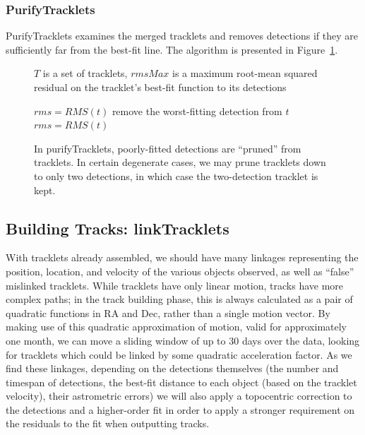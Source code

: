 \subsubsection{PurifyTracklets}
PurifyTracklets examines the merged tracklets and removes detections
if they are sufficiently far from the best-fit line. The algorithm is
presented in Figure~\ref{purifyTrackletsAlgorithm}. 

\begin{figure}[ht]
\hrulefill
\begin{algorithmic}[5]
  \Require $T$ is a set of tracklets, $rmsMax$ is a maximum root-mean
  squared residual on the tracklet's best-fit function to its
  detections

    \State $rms = RMS(t)$
      \State remove the worst-fitting detection from $t$
      \State $rms = RMS(t)$
    \EndWhile
  \EndFor
\end{algorithmic}
\hrulefill
\caption[purifyTracklets pseudocode.]{In purifyTracklets, poorly-fitted detections are ``pruned''
  from tracklets. In certain degenerate cases, we may prune tracklets
  down to only two detections, in which case the two-detection
  tracklet is kept.}
\label{purifyTrackletsAlgorithm}
\end{figure}







\subsection{Building Tracks: linkTracklets}

With tracklets already assembled, we should have many linkages
representing the position, location, and velocity of the various
objects observed, as well as ``false'' mislinked tracklets.  While
tracklets have only linear motion, tracks have more complex paths; in the
track building phase, this is always calculated as a pair of quadratic
functions in RA and Dec, rather than a single motion vector.  By
making use of this quadratic approximation of motion, valid for
approximately one month, we can move a sliding window of up to 30 days
over the data, looking for tracklets which could be linked by some
quadratic acceleration factor.  As we find these linkages, depending
on the detections themselves (the number and timespan of detections, the best-fit
distance to each object (based on the tracklet velocity), their
astrometric errors) we will also apply a topocentric correction to the
detections and a higher-order fit in order to apply a stronger
requirement on the residuals to the fit when outputting tracks. 


